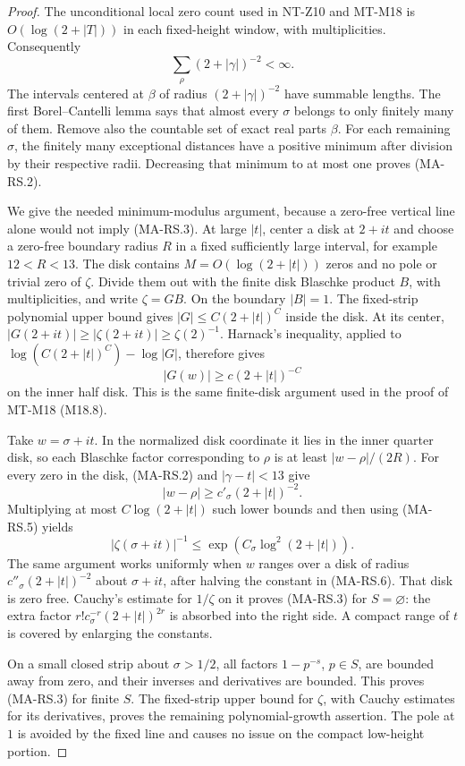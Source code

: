 \begin{proof}
The unconditional local zero count used in NT-Z10 and
MT-M18 is $O(\log(2+|T|))$ in each fixed-height window,
with multiplicities.  Consequently
\[
                  \sum_\rho (2+|\gamma|)^{-2}<\infty.
 \tag{MA-RS.4}
\]
The intervals centered at $\beta$ of radius
$(2+|\gamma|)^{-2}$ have summable lengths.
The first Borel--Cantelli lemma says that almost every
$\sigma$ belongs to only finitely many of them.
Remove also the countable set of exact real parts $\beta$.
For each remaining $\sigma$, the finitely many exceptional
distances have a positive minimum after division by their
respective radii.  Decreasing that minimum to at most one
proves (MA-RS.2).

We give the needed minimum-modulus argument, because a
zero-free vertical line alone would not imply (MA-RS.3).
At large $|t|$, center a disk at $2+it$ and choose a
zero-free boundary radius $R$ in a fixed sufficiently large
interval, for example $12<R<13$.
The disk contains $M=O(\log(2+|t|))$ zeros and no pole or
trivial zero of $\zeta$.  Divide them out with the finite
disk Blaschke product $B$, with multiplicities, and write
$\zeta=G B$.  On the boundary $|B|=1$.
The fixed-strip polynomial upper bound gives
$|G|\le C(2+|t|)^C$ inside the disk.  At its center,
$|G(2+it)|\ge|\zeta(2+it)|\ge\zeta(2)^{-1}$.
Harnack's inequality, applied to
$\log(C(2+|t|)^C)-\log|G|$, therefore gives
\[
          |G(w)|\ge c(2+|t|)^{-C}
 \tag{MA-RS.5}
\]
on the inner half disk.  This is the same finite-disk
argument used in the proof of MT-M18 (M18.8).

Take $w=\sigma+it$.  In the normalized disk coordinate
it lies in the inner quarter disk, so each Blaschke
factor corresponding to $\rho$ is at least
$|w-\rho|/(2R)$.  For every zero in the disk,
(MA-RS.2) and $|\gamma-t|<13$ give
\[
       |w-\rho|\ge c'_\sigma(2+|t|)^{-2}.
 \tag{MA-RS.6}
\]
Multiplying at most $C\log(2+|t|)$ such lower bounds and
then using (MA-RS.5) yields
\[
        |\zeta(\sigma+it)|^{-1}
              \le \exp(C_\sigma\log^2(2+|t|)).
 \tag{MA-RS.7}
\]
The same argument works uniformly when $w$ ranges over
a disk of radius $c''_\sigma(2+|t|)^{-2}$ about
$\sigma+it$, after halving the constant in (MA-RS.6).
That disk is zero free.  Cauchy's estimate for $1/\zeta$
on it proves (MA-RS.3) for $S=\varnothing$: the extra
factor $r!c_\sigma^{-r}(2+|t|)^{2r}$ is absorbed into
the right side.  A compact range of $t$ is covered by
enlarging the constants.

On a small closed strip about $\sigma>1/2$, all factors
$1-p^{-s}$, $p\in S$, are bounded away from zero, and
their inverses and derivatives are bounded.
This proves (MA-RS.3) for finite $S$.
The fixed-strip upper bound for $\zeta$, with Cauchy
estimates for its derivatives, proves the remaining
polynomial-growth assertion.  The pole at $1$ is
avoided by the fixed line and causes no issue on the
compact low-height portion.
\end{proof}

